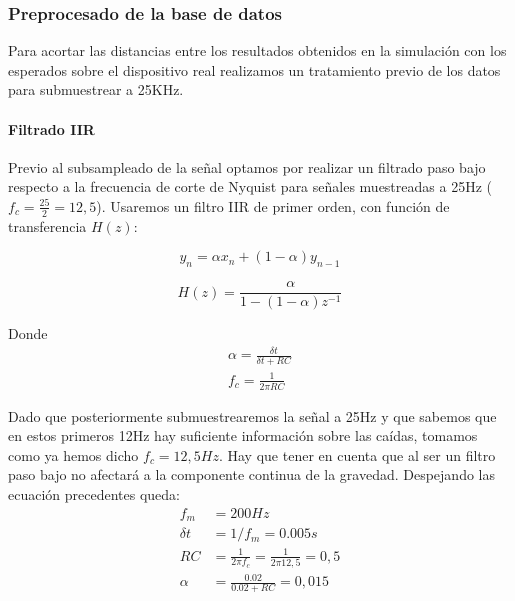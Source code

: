\subsubsection{Preprocesado de la base de datos}

Para acortar las distancias entre los resultados obtenidos en la simulación con los esperados sobre el dispositivo real realizamos un tratamiento previo de los datos para submuestrear a 25KHz.


\paragraph{Filtrado IIR}

Previo al subsampleado de la señal optamos por realizar un filtrado paso bajo respecto a la frecuencia de corte de Nyquist para señales muestreadas a 25Hz ($f_c=\frac{25}{2}=12,5$). Usaremos un filtro IIR de primer orden, con función de transferencia $H(z)$:

\[
  y_n = \alpha x_n + (1-\alpha) y_{n-1}
\]


\[
  H(z) = \frac{\alpha}{1-(1-\alpha)z^{-1}}
\]

Donde
\begin{align*}
\alpha = \frac{\delta t}{\delta t + RC} \\
f_c= \frac{1}{2 \pi RC}
\end{align*}

Dado que posteriormente submuestrearemos la señal a 25Hz y que sabemos que en estos primeros 12Hz hay suficiente información sobre las caídas, tomamos como ya hemos dicho $f_c=12,5Hz$. Hay que tener en cuenta que al ser un filtro paso bajo no afectará a la componente continua de la gravedad. Despejando las ecuación precedentes queda:
\begin{align*}
  f_m & = 200{Hz}\\
  \delta t & = 1/f_m = 0.005s\\
  RC & =\frac{1}{2\pi f_c} = \frac{1}{2\pi12,5} = 0,5\\
  \alpha & = \frac{0.02}{0.02 + RC} = 0,015
\end{align*}

\begin{comment}
\end{comment}

